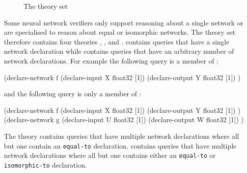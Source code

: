\begin{figure}[h]
\centering
{}
\caption{The \multiNetwork{} theory set}
\label{fig:multiple-networks-theory-set}
\end{figure}

Some neural network verifiers only support reasoning about a single network or are specialised to reason about equal or isomorphic networks. The \multiNetwork{} theory set therefore contains four theories \snet{}, \menet{}, \minet{} and \mnet{}. \snet{} contains queries that have a single network declaration while \mnet{} contains queries that have an arbitrary number of network declarations. For example the following query is a member of \snet{}:

\begin{code}[style=lbnf]
(declare-network f
    (declare-input  X float32 [1])
    (declare-output Y float32 [1])
)
\end{code}

and the following query is only a member of \mnet{}:

\begin{code}[style=lbnf]
(declare-network f
    (declare-input  X float32 [1])
    (declare-output Y float32 [1])
)
(declare-network g
    (declare-input  U float32 [1])
    (declare-output W float32 [1])
)
\end{code}

The theory \menet{} contains queries that have multiple network declarations where all but one contain an \texttt{equal-to} declaration.
\minet{} contains queries that have multiple network declarations where all but one contains either an \texttt{equal-to} or \texttt{isomorphic-to} declaration.


\subsection{\multiComparison{}}
\label{sec:multi-node-comparisons}

